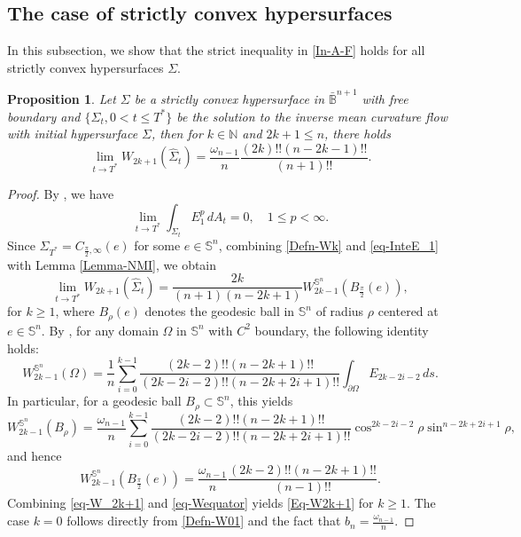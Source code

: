 \documentclass[11pt,reqno]{amsart}
\newtheorem{prop}[thm]{Proposition}
\theoremstyle{definition}
\theoremstyle{remark}
\numberwithin{equation}{section}
\renewcommand{\(}{\left(}
\renewcommand{\)}{\right)}
\renewcommand{\-}{\overline}
\begin{document}
\subsection{The case of strictly convex hypersurfaces} In this subsection, we show that  the strict inequality  in \eqref{In-A-F} holds for all strictly convex hypersurfaces $\Sigma$. 
\begin{prop}\label{Prop-lim}
	Let $\Sigma$ be a strictly convex hypersurface in $\bar{\mathbb{B}}^{n+1}$ with free boundary and $\{\Sigma_t,0<t\leq T^*\}$ be the solution to the inverse mean curvature flow with initial hypersurface $\Sigma$, then for $k\in\mathbb{N}$ and $2k+1\leq n$, there holds
	\begin{equation}\label{Eq-W2k+1}
	 \lim_{t\to T^*}W_{2k+1}(\widehat{\Sigma}_t)=\frac{\omega_{n-1}}{n}\frac{(2k)!!(n-2k-1)!!}{(n+1)!!}.
	\end{equation}
\end{prop}
\begin{proof}
	By \cite[Lemma 2.2]{Lambert-Scheuer2017}, we have
	\begin{equation}\label{eq-InteE_1}
		\lim_{t\to T^{*}}\int_{\Sigma_t}{E_1^p}\,dA_t=0,\quad 1\leq p<\infty.
	\end{equation}
Since $\Sigma_{T^*}=C_{\frac{\pi}{2},\infty}(e)$ for some $e\in\mathbb{S}^n$, combining \eqref{Defn-Wk} and \eqref{eq-InteE_1} with  Lemma \ref{Lemma-NMI}, we obtain
\begin{equation}\label{eq-W_2k+1}
	\lim_{t\to T^{*}}W_{2k+1}(\widehat{\Sigma}_t)=\frac{2k}{(n+1)(n-2k+1)}W_{2k-1}^{\mathbb{S}^n}(B_{\frac{\pi}{2}}(e)),
\end{equation}
for $k\geq 1$, where $B_{\rho}(e)$ denotes the geodesic ball in $\mathbb{S}^n$ of radius $\rho$ centered at $e\in\mathbb{S}^n$. By \cite[Corollary 8]{Sol06}, for any domain $\Omega$ in $\mathbb{S}^n$ with $C^2$ boundary, the following identity holds:
\begin{equation*}
	W_{2k-1}^{\mathbb{S}^n}(\Omega)=\frac{1}{n}\sum_{i=0}^{k-1}\frac{(2k-2)!!(n-2k+1)!!}{(2k-2i-2)!!(n-2k+2i+1)!!}\int_{\partial\Omega}{E_{2k-2i-2}}\,ds.
\end{equation*}
In particular, for a geodesic ball $B_{\rho}\subset\mathbb{S}^n$,  this yields
\begin{equation*}
	W_{2k-1}^{\mathbb{S}^n}(B_{\rho})=\frac{\omega_{n-1}}{n}\sum_{i=0}^{k-1}\frac{(2k-2)!!(n-2k+1)!!}{(2k-2i-2)!!(n-2k+2i+1)!!}\cos^{2k-2i-2}\rho\sin^{n-2k+2i+1}\rho,
\end{equation*}
and hence
\begin{equation}\label{eq-Wequator}
	W_{2k-1}^{\mathbb{S}^n}(B_{\frac{\pi}{2}}(e))=\frac{\omega_{n-1}}{n}\frac{(2k-2)!!(n-2k+1)!!}{(n-1)!!}.
\end{equation}
Combining \eqref{eq-W_2k+1} and \eqref{eq-Wequator} yields \eqref{Eq-W2k+1} for $k\geq 1$. The case $k=0$ follows directly from \eqref{Defn-W01} and the fact that $b_n=\frac{\omega_{n-1}}{n}$.
\end{proof}
\end{document}
